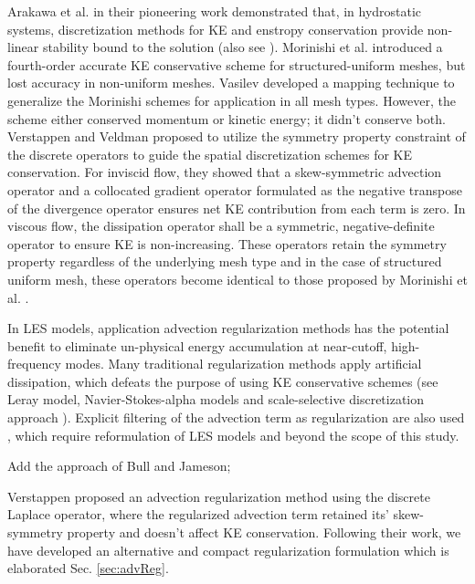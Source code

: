 Arakawa et al.\cite{arakawa1966, arakawa1977} in their pioneering work demonstrated that, in hydrostatic systems, discretization methods for KE and enstropy conservation provide non-linear stability bound to the solution (also see \cite{sadourny1975}). Morinishi et al. \cite{morinishi1998} introduced a fourth-order accurate KE conservative scheme for structured-uniform meshes, but lost accuracy in non-uniform meshes. Vasilev \cite{vasilyev2000} developed a mapping technique to generalize the Morinishi schemes for application in all mesh types. However, the scheme either conserved momentum or kinetic energy; it didn't conserve both. Verstappen and Veldman \cite{verstappen2003} proposed to utilize the symmetry property constraint of the discrete operators to guide the spatial discretization schemes for KE conservation. For inviscid flow, they showed that a skew-symmetric advection operator and a collocated gradient operator formulated as the negative transpose of the divergence operator ensures net KE contribution from each term is zero. In viscous flow, the dissipation operator shall be a symmetric, negative-definite operator to ensure KE is non-increasing. These operators retain the symmetry property regardless of the underlying mesh type and in the case of structured uniform mesh, these operators become identical to those proposed by Morinishi et al. \cite{morinishi1998}.


In LES models, application advection regularization methods has the potential benefit to eliminate un-physical energy accumulation at near-cutoff, high-frequency modes. Many traditional regularization methods apply artificial dissipation, which defeats the purpose of using KE conservative schemes (see Leray model\cite{leray1934}, Navier-Stokes-alpha models\cite{holm1998, montgomery2002, marsden2003} and scale-selective discretization approach \cite{vuorinen2012}). Explicit filtering of the advection term as regularization are also used \cite{lund2003, gullbrand2003, bose2010, bose2010a, singh2012}, which require reformulation of LES models and beyond the scope of this study.

Add the approach of Bull and Jameson;

 Verstappen \cite{verstappen2008} proposed an advection regularization method using the discrete Laplace operator, where the regularized advection term retained its' skew-symmetry property and doesn't affect KE conservation. Following their work, we have developed an alternative and compact regularization formulation which is elaborated Sec. \ref{sec:advReg}.

